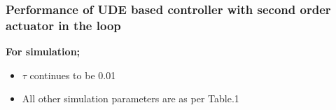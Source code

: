 \documentclass[table,10pt,red]{beamer}	%
\begin{document}
\begin{frame}
\frametitle{Performance of UDE based controller with second order actuator in the loop}
\textbf{For simulation;}
\begin{itemize}  %
		\item $\tau$ continues to be 0.01
		\item All other simulation parameters are as per Table.1
\end{itemize}
\end{frame}
%
\end{document}
